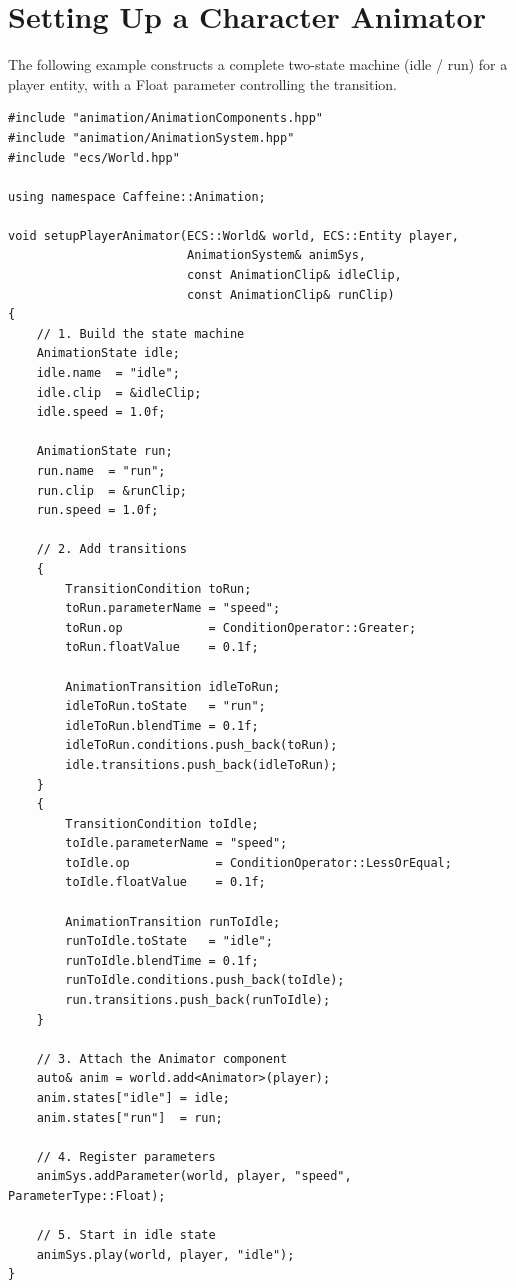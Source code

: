 \section{Setting Up a Character Animator}

The following example constructs a complete two-state machine (idle / run)
for a player entity, with a Float parameter controlling the transition.

\begin{lstlisting}
#include "animation/AnimationComponents.hpp"
#include "animation/AnimationSystem.hpp"
#include "ecs/World.hpp"

using namespace Caffeine::Animation;

void setupPlayerAnimator(ECS::World& world, ECS::Entity player,
                         AnimationSystem& animSys,
                         const AnimationClip& idleClip,
                         const AnimationClip& runClip)
{
    // 1. Build the state machine
    AnimationState idle;
    idle.name  = "idle";
    idle.clip  = &idleClip;
    idle.speed = 1.0f;

    AnimationState run;
    run.name  = "run";
    run.clip  = &runClip;
    run.speed = 1.0f;

    // 2. Add transitions
    {
        TransitionCondition toRun;
        toRun.parameterName = "speed";
        toRun.op            = ConditionOperator::Greater;
        toRun.floatValue    = 0.1f;

        AnimationTransition idleToRun;
        idleToRun.toState   = "run";
        idleToRun.blendTime = 0.1f;
        idleToRun.conditions.push_back(toRun);
        idle.transitions.push_back(idleToRun);
    }
    {
        TransitionCondition toIdle;
        toIdle.parameterName = "speed";
        toIdle.op            = ConditionOperator::LessOrEqual;
        toIdle.floatValue    = 0.1f;

        AnimationTransition runToIdle;
        runToIdle.toState   = "idle";
        runToIdle.blendTime = 0.1f;
        runToIdle.conditions.push_back(toIdle);
        run.transitions.push_back(runToIdle);
    }

    // 3. Attach the Animator component
    auto& anim = world.add<Animator>(player);
    anim.states["idle"] = idle;
    anim.states["run"]  = run;

    // 4. Register parameters
    animSys.addParameter(world, player, "speed", ParameterType::Float);

    // 5. Start in idle state
    animSys.play(world, player, "idle");
}
\end{lstlisting}

